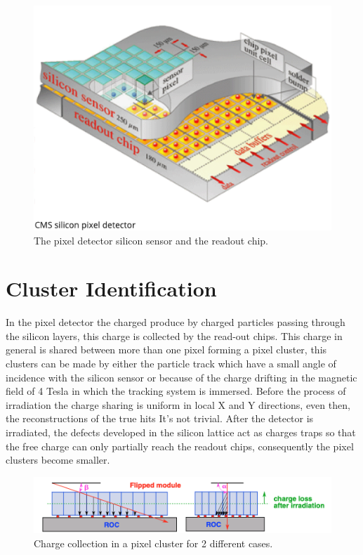 \begin{figure}[H]
    \centering
    \includegraphics[height=0.55\textwidth, width=1\textwidth]{PixelSensor.png}
    \caption{The pixel detector silicon sensor and the readout chip. \cite{sensorpic}}
    \label{fig:sensor}
\end{figure}

\section{Cluster Identification}

In the pixel detector the charged produce by charged particles passing through the silicon layers, this charge is collected by the read-out chips. This charge in general is shared between more than one pixel forming a pixel cluster, this clusters can be made by either the particle track which have a small angle of incidence with the silicon sensor or because of the charge drifting in the magnetic field of 4 Tesla in which the tracking system is immersed. Before the process of irradiation the charge sharing is uniform in local X and Y directions, even then, the reconstructions of the true hits It's not trivial. After the detector is irradiated, the defects developed in the silicon lattice act as charges traps so that the free charge can only partially reach the readout chips, consequently the pixel clusters become smaller. \cite{cluster1}

\begin{figure}[h]
    \centering
    \includegraphics[width=1\textwidth]{cluster3.png}
    \caption{Charge collection in a pixel cluster for 2 different cases.}
    \label{fig:cluster}
\end{figure}

